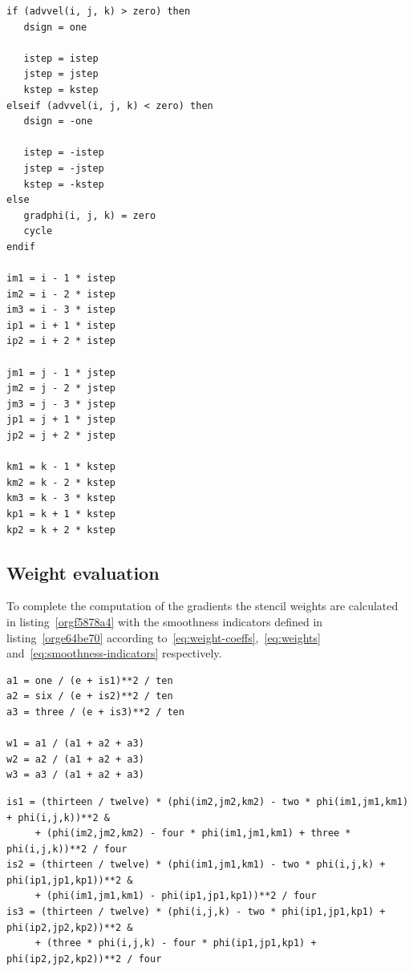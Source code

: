 \documentclass[11pt]{article}
\begin{document}
\begin{lstlisting}
if (advvel(i, j, k) > zero) then
   dsign = one

   istep = istep
   jstep = jstep
   kstep = kstep
elseif (advvel(i, j, k) < zero) then
   dsign = -one

   istep = -istep
   jstep = -jstep
   kstep = -kstep
else
   gradphi(i, j, k) = zero
   cycle
endif

im1 = i - 1 * istep
im2 = i - 2 * istep
im3 = i - 3 * istep
ip1 = i + 1 * istep
ip2 = i + 2 * istep

jm1 = j - 1 * jstep
jm2 = j - 2 * jstep
jm3 = j - 3 * jstep
jp1 = j + 1 * jstep
jp2 = j + 2 * jstep

km1 = k - 1 * kstep
km2 = k - 2 * kstep
km3 = k - 3 * kstep
kp1 = k + 1 * kstep
kp2 = k + 2 * kstep
\end{lstlisting}

\subsection{Weight evaluation}
\label{sec:org5b8a607}

To complete the computation of the gradients the stencil weights are calculated in
listing~\ref{orgf5878a4} with the smoothness indicators defined in listing~\ref{orge64be70}
according to~\eqref{eq:weight-coeffs},~\eqref{eq:weights} and~\eqref{eq:smoothness-indicators}
respectively.

\begin{lstlisting}
a1 = one / (e + is1)**2 / ten
a2 = six / (e + is2)**2 / ten
a3 = three / (e + is3)**2 / ten

w1 = a1 / (a1 + a2 + a3)
w2 = a2 / (a1 + a2 + a3)
w3 = a3 / (a1 + a2 + a3)
\end{lstlisting}

\begin{lstlisting}
is1 = (thirteen / twelve) * (phi(im2,jm2,km2) - two * phi(im1,jm1,km1) + phi(i,j,k))**2 &
     + (phi(im2,jm2,km2) - four * phi(im1,jm1,km1) + three * phi(i,j,k))**2 / four
is2 = (thirteen / twelve) * (phi(im1,jm1,km1) - two * phi(i,j,k) + phi(ip1,jp1,kp1))**2 &
     + (phi(im1,jm1,km1) - phi(ip1,jp1,kp1))**2 / four
is3 = (thirteen / twelve) * (phi(i,j,k) - two * phi(ip1,jp1,kp1) + phi(ip2,jp2,kp2))**2 &
     + (three * phi(i,j,k) - four * phi(ip1,jp1,kp1) + phi(ip2,jp2,kp2))**2 / four
\end{lstlisting}
\end{document}
